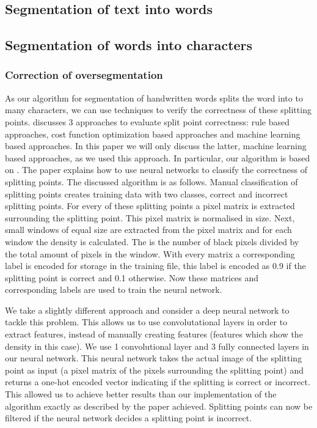\documentclass{article}
\begin{document}
\subsection{Segmentation of text into words}
\subsection{Segmentation of words into characters}
\subsubsection{Correction of oversegmentation}
As our algorithm for segmentation of handwritten words splits the word into to many characters, we can use techniques to verify the correctness of these splitting points. 
\cite{evalsplitpoints} discusses 3 approaches to evaluate split point correctness: rule based approaches, cost function optimization based approaches and machine learning based approaches. 
In this paper we will only discuss the latter, machine learning based approaches, as we used this approach. 
In particular, our algorithm is based on \cite{evalsplitpointsnn}. The paper explains how to use neural networks to classify the correctness of splitting points. The discussed algorithm is as follows. Manual classification of splitting points creates training data with two classes, correct and incorrect splitting points. 
For every of these splitting points a pixel matrix is extracted surrounding the splitting point. This pixel matrix is normalised in size. 
Next, small windows of equal size are extracted from the pixel matrix and for each window the density is calculated. The is the number of black pixels divided by the total amount of pixels in the window. 
With every matrix a corresponding label is encoded for storage in the training file, this label is encoded as 0.9 if the splitting point is correct and 0.1 otherwise. Now these matrices and corresponding labels are used to train the neural network. 

We take a slightly different approach and consider a deep neural network to tackle this problem. This allows us to use convolutational layers in order to extract features, instead of manually creating features (features which show the density in this case). 
We use 1 convolutional layer and 3 fully connected layers in our neural network. This neural network takes the actual image of the splitting point as input (a pixel matrix of the pixels surrounding the splitting point) and returns a one-hot encoded vector indicating if the splitting is correct or incorrect. 
This allowed us to achieve better results than our implementation of the algorithm exactly as described by the paper achieved. Splitting points can now be filtered if the neural network decides a splitting point is incorrect. 
\end{document}
